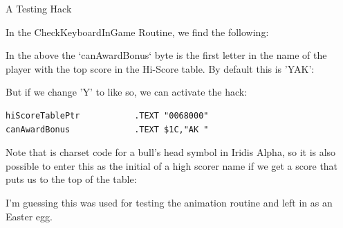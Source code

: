 \begin{tcolorbox}[%
  breakable,
  parbox = false,
  frame hidden,
  sharp corners,
  after skip=10pt,
  overlay broken = {
    \draw[]
      (frame.north west) rectangle (frame.south east);},
]{}
A Testing Hack

In the CheckKeyboardInGame Routine, we find the following:
%


In the above the `canAwardBonus` byte is the first letter in the name of the player with the top score in the Hi-Score table. By default this is 'YAK':
%


But if we change 'Y' to  like so, we can activate the hack:

\begin{lstlisting}[basicstyle=\tiny]
hiScoreTablePtr           .TEXT "0068000"
canAwardBonus             .TEXT $1C,"AK "
\end{lstlisting}

Note that  is charset code for a bull's head symbol in Iridis Alpha, so it is also possible to enter this as the initial of a high scorer name if we get a score that puts us to the top of the table:

%



I'm guessing this was used for testing the animation routine and left in as an Easter egg.



\end{tcolorbox}%
